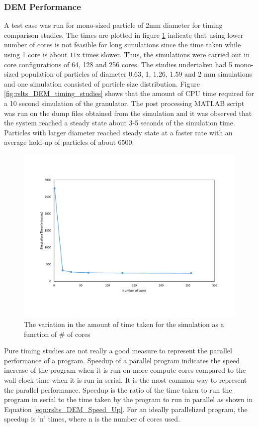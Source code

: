 \documentclass[preprint,11pt,authoryear]{elsarticle}
\begin{document}
\subsubsection{DEM Performance}
 A test case was run for mono-sized particle of 2mm diameter for timing comparison studies. The 
times are plotted in figure \ref{fig:rslts_DEM_2mm_timing} indicate that using lower number of cores is 
not feasible for long simulations since the time taken while using 1 core is about $11$x times slower.
Thus, the simulations were carried out in core configurations of 64, 128 and 256 cores. The studies 
undertaken had 5 mono-sized population of particles of diameter 0.63, 1, 1.26, 1.59 and 2 mm 
simulations and one simulation consisted of particle size distribution. Figure 
\ref{fig:rslts_DEM_timing_studies} shows that the amount of CPU time required for a 10 second 
simulation of the granulator. The post processing MATLAB script was run on the dump files obtained 
from the simulation and it was observed that the system reached a steady state about 3-5 seconds of 
the simulation time. Particles with larger diameter reached steady state at a faster rate with an average 
hold-up of particles of about 6500. 
\begin{figure}[H]
\centering
\includegraphics[scale=0.5]{rslts_DEM_2mm_timing.pdf}
\caption{The variation in the amount of time taken for the simulation as a function of \# of cores}
\label{fig:rslts_DEM_2mm_timing}
\end{figure}	

Pure timing studies are not really a good measure to represent the parallel performance of a program. 
Speedup of a parallel program indicates the speed increase of the program when it is run on more 
compute cores compared to the wall clock time when it is run in serial. It is the most common way to 
represent the parallel performance. Speedup is the ratio of the time taken to run the program in serial 
to the time taken by the program to run in parallel as shown in Equation \ref{eqn:rslts_DEM_Speed_Up}. 
For an ideally parallelized program, the speedup is 'n' times, where n is the number of cores used.\\
\end{document}
